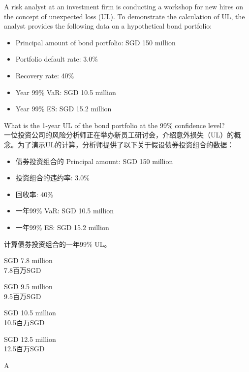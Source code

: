 \documentclass{article}
\newcounter{question} %
\begin{document}
\begin{question}
    A risk analyst at an investment firm is conducting a workshop for new hires on the concept of unexpected loss (UL). To demonstrate the calculation of UL, the analyst provides the following data on a hypothetical bond portfolio:
    
    \begin{itemize}
        \item Principal amount of bond portfolio: SGD 150 million  
        \item Portfolio default rate: 3.0\%  
        \item Recovery rate: 40\%  
        \item Year 99\% VaR: SGD 10.5 million  
        \item Year 99\% ES: SGD 15.2 million  
    \end{itemize}
    
    What is the 1-year UL of the bond portfolio at the 99\% confidence level?
    \\一位投资公司的风险分析师正在举办新员工研讨会，介绍意外损失（UL）的概念。为了演示UL的计算，分析师提供了以下关于假设债券投资组合的数据：
    \begin{itemize}
        \item 债券投资组合的 Principal amount: SGD 150 million  
        \item 投资组合的违约率: 3.0\%  
        \item 回收率: 40\%  
        \item 一年99\% VaR: SGD 10.5 million  
        \item 一年99\% ES: SGD 15.2 million  
    \end{itemize}

    计算债券投资组合的一年99\% UL。
\end{question}

\begin{choices}
    \item SGD 7.8 million  \\
    7.8百万SGD
    \item SGD 9.5 million  \\
    9.5百万SGD
    \item SGD 10.5 million  \\
    10.5百万SGD
    \item SGD 12.5 million  \\
    12.5百万SGD
\end{choices}

\begin{correctanswer}
    A
\end{correctanswer}
\end{document}
